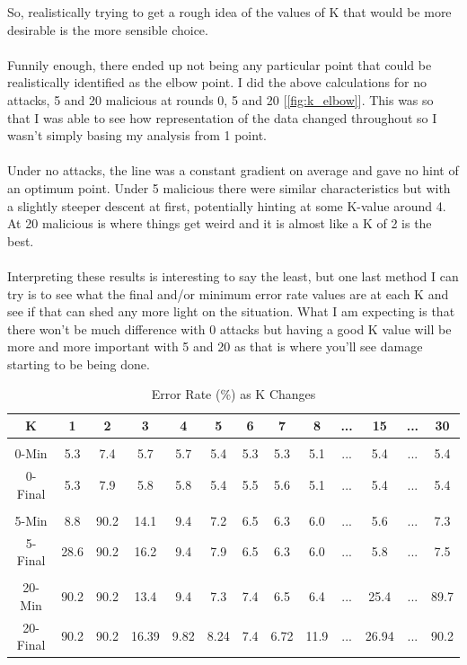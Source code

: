 So, realistically trying to get a rough idea of the values of K that would be more desirable is the more sensible choice.
\\ \\
Funnily enough, there ended up not being any particular point that could be realistically identified as the elbow point.
I did the above calculations for no attacks, 5 and 20 malicious at rounds 0, 5 and 20 [\ref{fig:k_elbow}].
This was so that I was able to see how representation of the data changed throughout so I wasn't simply basing my analysis from 1 point.
\\ \\
Under no attacks, the line was a constant gradient on average and gave no hint of an optimum point.
Under 5 malicious there were similar characteristics but with a slightly steeper descent at first, potentially hinting at some K-value around 4.
At 20 malicious is where things get weird and it is almost like a K of 2 is the best.
\\ \\
Interpreting these results is interesting to say the least, but one last method I can try is to see what the final and/or minimum error rate values are at each K and see if that can shed any more light on the situation.
What I am expecting is that there won't be much difference with 0 attacks but having a good K value will be more and more important with 5 and 20 as that is where you'll see damage starting to be being done.
\begin{center}
    \begin{longtable}{ |c|c|c|c|c|c|c|c|c|c|c|c|c| }
    \caption{Error Rate (\%) as K Changes}
    \label{tbl:k_error_rate}
    \hline
    K & 1 & 2 & 3 & 4 & 5 & 6 & 7 & 8 & ... & 15 & ... & 30 \\ \hline
    \multicolumn{13}{|c|}{} \\ \hline
    0-Min & 5.3 & 7.4 & 5.7	& 5.7	& 5.4	& 5.3	& 5.3	& 5.1 & ...	& 5.4 & ... & 5.4 \\ \hline
    0-Final & 5.3	& 7.9	& 5.8	& 5.8	& 5.4	& 5.5	& 5.6	& 5.1 & ...	& 5.4 & ...  & 5.4 \\ \hline
    \multicolumn{13}{|c|}{} \\ \hline
    5-Min & 8.8 &	90.2 &	14.1 &	9.4 &	7.2 &	6.5 &	6.3 &	6.0 & ... &	5.6 & ...  & 7.3 \\ \hline
    5-Final & 28.6	& 90.2	& 16.2	& 9.4	& 7.9	& 6.5	& 6.3	& 6.0 & ...	& 5.8 & ...  & 7.5 \\ \hline
    \multicolumn{13}{|c|}{} \\ \hline
    20-Min & 90.2	& 90.2	& 13.4	& 9.4	& 7.3	& 7.4	& 6.5	& 6.4 & ...	& 25.4 & ...  & 89.7 \\ \hline
    20-Final & 90.2	& 90.2	& 16.39	& 9.82	& 8.24	& 7.4	& 6.72	& 11.9	& ...	& 26.94 & ...  & 90.2 \\ \hline
    \end{longtable}
\end{center}

